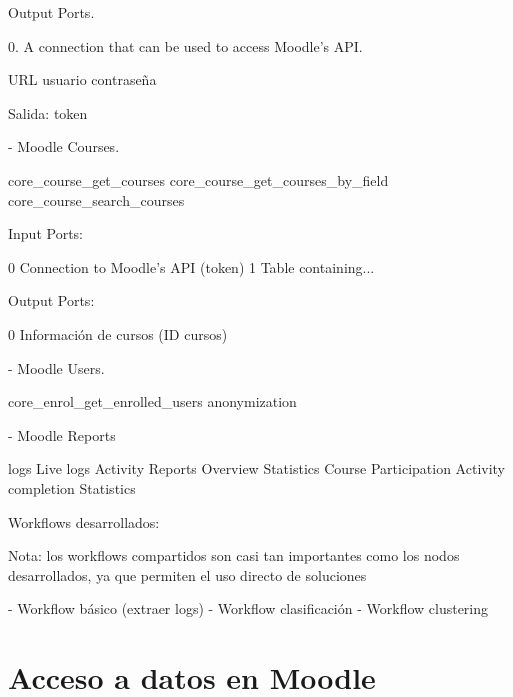 Output Ports. 

0. A connection that can be used to access Moodle's API.

URL
usuario
contraseña


Salida: token

- Moodle Courses. 

core\_course\_get\_courses
core\_course\_get\_courses\_by\_field
core\_course\_search\_courses

Input Ports: 

0 Connection to Moodle's API (token)
1 Table containing... 

Output Ports: 

0 Información de cursos (ID cursos)



- Moodle Users. 

core\_enrol\_get\_enrolled\_users
anonymization


- Moodle Reports

logs
Live logs
Activity Reports
Overview Statistics
Course Participation
Activity completion
Statistics


Workflows desarrollados: 

Nota: los workflows compartidos son casi tan importantes como los nodos desarrollados, ya que permiten el uso directo de soluciones 

- Workflow básico (extraer logs)
- Workflow clasificación
- Workflow clustering


\section{Acceso a datos en Moodle}
